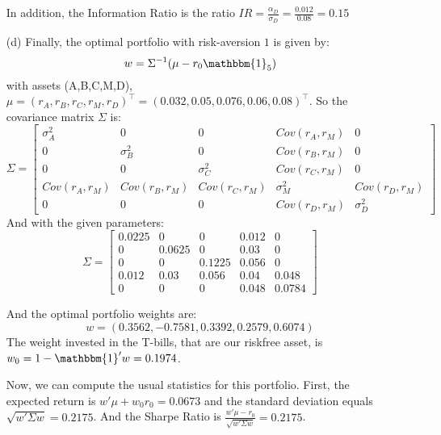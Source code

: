 \documentclass[10pt]{article}
\begin{document}
\begin{itemize}
  In addition, the Information Ratio is the ratio $IR = \frac{\alpha_D}{\sigma_D} =\frac{0.012}{0.08}= 0.15$
  \item[(d)] Finally, the optimal portfolio with risk-aversion $1$ is given by:
  $$ w = \Sigma^{-1}(\mu-r_0\mathbbm{1}_5)$$ with assets (A,B,C,M,D), $\mu = (r_A,r_B,r_C,r_M,r_D)^\top = (0.032,0.05,0.076,0.06,0.08)^\top$. So the covariance matrix $\Sigma$ is: 
  $$ \Sigma = \left[\begin{array}{ccccc}
    \sigma_A^2& 0 &0 &Cov(r_A,r_M)& 0\\
    0&\sigma_B^2 & 0 & Cov(r_B,r_M)&0 \\
    0&0&\sigma_C^2&Cov(r_C,r_M)&0\\
    Cov(r_A,r_M)&Cov(r_B,r_M)&Cov(r_C,r_M)&\sigma_M^2&Cov(r_D,r_M)\\
    0&0&0&Cov(r_D,r_M)&\sigma_D^2
  \end{array}\right]$$ 
  And with the given parameters: 
  $$ \Sigma = \left[\begin{array}{ccccc}
    0.0225 & 0 & 0 & 0.012 &0 \\
    0 & 0.0625 & 0 & 0.03 & 0 \\
    0 & 0 & 0.1225 & 0.056 & 0 \\
    0.012 & 0.03 & 0.056 & 0.04 & 0.048 \\
    0 & 0 & 0 & 0.048 & 0.0784 
  \end{array}\right]$$

  And the optimal portfolio weights are: 
 $$ w = (0.3562, -0.7581, 0.3392, 0.2579, 0.6074)$$
 The weight invested in the T-bills, that are our riskfree asset, is $w_0 = 1- \mathbbm{1}'w = 0.1974$.

 Now, we can compute the usual statistics for this portfolio. First, the expected return is $w'\mu + w_0r_0 = 0.0673$ and the standard deviation equals $\sqrt{w'\Sigma w} = 0.2175$. And the Sharpe Ratio is $ \frac{w'\mu - r_0}{\sqrt{w'\Sigma w}} = 0.2175$.
\end{itemize}
  
\end{document}
